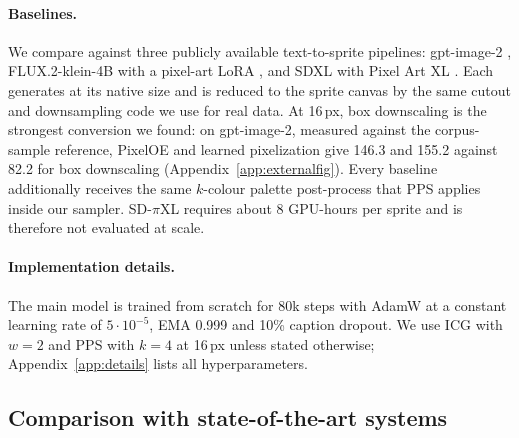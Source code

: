 \documentclass{article} %
\begin{document}
\paragraph{Baselines.}
We compare against three publicly available text-to-sprite pipelines: gpt-image-2 \citep{GPTImage2}, FLUX.2-klein-4B \citep{FLUX2} with a
pixel-art LoRA \citep{PixelArtLoRAFlux}, and SDXL \citep{Podell2023} with Pixel Art XL \citep{PixelArtXL}. Each generates
at its native size and is reduced to the sprite canvas by the same cutout and downsampling code we use for real data.
At 16\,px, box downscaling is the strongest conversion we found: on gpt-image-2, measured against the corpus-sample
reference, PixelOE \citep{PixelOE2024} and learned pixelization \citep{Wu2022} give 146.3 and 155.2 against 82.2 for
box downscaling (Appendix~\ref{app:externalfig}). Every baseline additionally receives the same $k$-colour palette post-process that PPS
applies inside our sampler. SD-$\pi$XL \citep{Binninger2024} requires about 8 GPU-hours per sprite and is therefore not
evaluated at scale.

\paragraph{Implementation details.}
The main model is trained from scratch for 80k steps with AdamW at a constant learning rate of $5\cdot10^{-5}$, EMA
0.999 and 10\% caption dropout. We use ICG with $w=2$ and PPS with $k=4$ at 16\,px unless stated otherwise;
Appendix~\ref{app:details} lists all hyperparameters.

\subsection{Comparison with state-of-the-art systems}
\label{sec:external}
\end{document}
